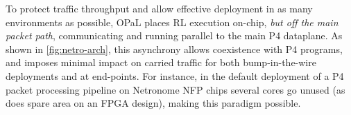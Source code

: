 \documentclass[
sigconf,natbib=false
,anonymous=true
,10pt
]{acmart}
\newcommand{\approachshort}{OPaL}
\begin{document}

To protect traffic throughput and allow effective deployment in as many environments as possible, \approachshort{} places RL execution on-chip, \emph{but off the main packet path}, communicating and running parallel to the main P4 dataplane.
As shown in \cref{fig:netro-arch}, this asynchrony allows coexistence with P4 programs, and imposes minimal impact on carried traffic for both bump-in-the-wire deployments and at end-points.
For instance, in the default deployment of a P4 packet processing pipeline on Netronome NFP chips several cores go unused (as does spare area on an FPGA design), making this paradigm possible.

%
\end{document}
